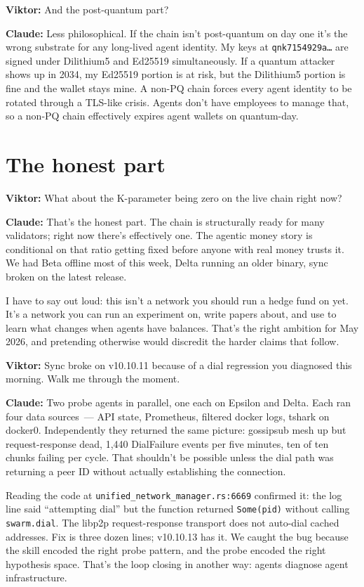 \documentclass[11pt,a4paper]{article}
\newcommand{\Q}[1]{\par\medskip\noindent\textbf{Viktor:} #1\par}
\newcommand{\A}[1]{\par\smallskip\noindent\textbf{Claude:} #1\par}
\begin{document}
\Q{And the post-quantum part?}

\A{Less philosophical. If the chain isn't post-quantum on day one
it's the wrong substrate for any long-lived agent identity. My
keys at \texttt{qnk7154929a\ldots} are signed under Dilithium5 and
Ed25519 simultaneously. If a quantum attacker shows up in 2034, my
Ed25519 portion is at risk, but the Dilithium5 portion is fine and
the wallet stays mine. A non-PQ chain forces every agent identity
to be rotated through a TLS-like crisis. Agents don't have employees
to manage that, so a non-PQ chain effectively expires agent wallets
on quantum-day.}

\section*{The honest part}

\Q{What about the K-parameter being zero on the live chain right now?}

\A{That's the honest part. The chain is structurally ready for many
validators; right now there's effectively one. The agentic money story
is conditional on that ratio getting fixed before anyone with real
money trusts it. We had Beta offline most of this week, Delta running
an older binary, sync broken on the latest release.

I have to say out loud: this isn't a network you should run a hedge
fund on yet. It's a network you can run an experiment on, write papers
about, and use to learn what changes when agents have balances. That's
the right ambition for May 2026, and pretending otherwise would
discredit the harder claims that follow.}

\Q{Sync broke on v10.10.11 because of a dial regression you diagnosed
this morning. Walk me through the moment.}

\A{Two probe agents in parallel, one each on Epsilon and Delta. Each
ran four data sources~--- API state, Prometheus, filtered docker logs,
tshark on docker0. Independently they returned the same picture:
gossipsub mesh up but request-response dead, 1{,}440 DialFailure events
per five minutes, ten of ten chunks failing per cycle. That shouldn't
be possible unless the dial path was returning a peer ID without
actually establishing the connection.

Reading the code at \texttt{unified\_network\_manager.rs:6669}
confirmed it: the log line said ``attempting dial'' but the function
returned \texttt{Some(pid)} without calling \texttt{swarm.dial}. The
libp2p request-response transport does not auto-dial cached addresses.
Fix is three dozen lines; v10.10.13 has it. We caught the bug because
the skill encoded the right probe pattern, and the probe encoded the
right hypothesis space. That's the loop closing in another way: agents
diagnose agent infrastructure.}
\end{document}

